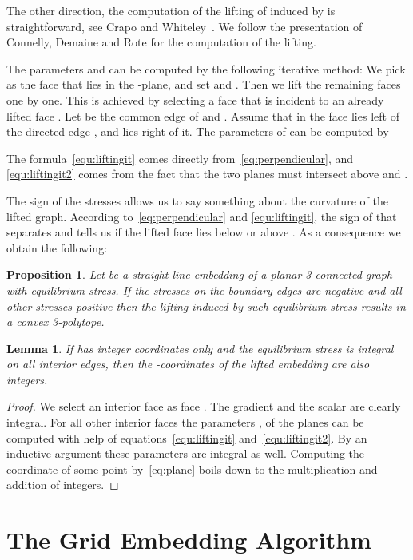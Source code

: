 \documentclass{article}
\theoremstyle{plain} \newtheorem{thm}{Theorem}[section]
\newtheorem{lem}{Lemma}[section]
\newtheorem{prop}{Proposition}
\begin{document}
The other direction, the computation of the lifting of  induced by  is straightforward,
see Crapo and Whiteley~\cite{cw-psspp-93}.
We follow the presentation of  Connelly, Demaine and Rote \cite{cdr-spcpc-03} for the computation of the lifting. 

The parameters  and  can be computed by the following iterative method:
We pick  as the face that lies in the -plane, and set  and . Then we lift the remaining faces one by one. This is achieved by selecting a face  that is incident to an already lifted face . 
Let  be the common edge of  and . Assume that in  the face   lies left of the  directed edge , and  lies right of it. The parameters of  can be computed by
 
The formula~\eqref{equ:liftingit} comes directly from~\eqref{eq:perpendicular}, and
\eqref{equ:liftingit2} comes from the fact that the two planes must intersect above  and .

The sign of the stresses allows us to say something about the curvature of the lifted graph. 
According to~\eqref{eq:perpendicular} and \eqref{equ:liftingit}, the sign of  that separates  and  tells us if the lifted face  lies below or above .
As a consequence we obtain the following:
\begin{prop}\label{obs:signstress}
Let  be a straight-line embedding of a planar 3-connected graph
  with equilibrium stress. 
If the stresses on the boundary edges are
negative and all other stresses positive then the
lifting induced by
such equilibrium stress results in a convex 3-polytope. 
\end{prop}

\begin{lem}\label{lem:scaling1}
If  has integer coordinates only and the equilibrium stress is integral on all interior edges, then the -coordinates
of the lifted embedding are also integers.
\end{lem}
\begin{proof}
We select an interior face as face .
The gradient  and
the scalar  are clearly integral. 
For all other interior faces  the parameters ,  
of the planes  can be computed with
help of equations~\eqref{equ:liftingit} and~\eqref{equ:liftingit2}. 
By an inductive argument 
these parameters are integral as well. 
Computing the -coordinate of some point 
by~\eqref{eq:plane}
boils down to the multiplication and addition of integers.
\end{proof}

\section{The Grid Embedding Algorithm}
\label{sec:embedding}
\end{document}

